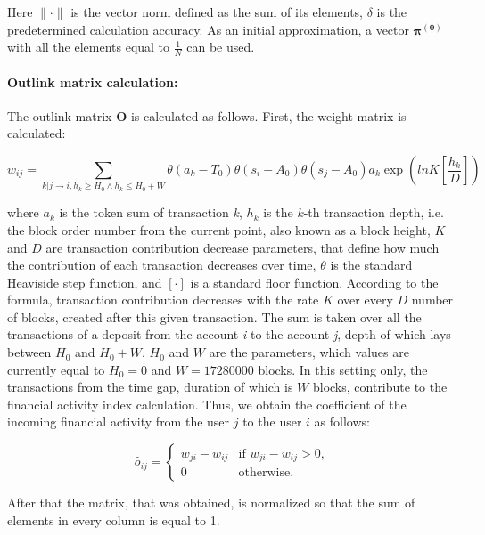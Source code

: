 \documentclass[a4paper,12pt]{article}
\begin{document}
Here $\lVert \cdot \rVert$ is the vector norm defined as the sum of its elements, $\delta$ is the predetermined calculation accuracy. As an initial approximation, a vector $\boldsymbol{\pi^{(0)}}$ with all the elements equal to $\frac{1}{N}$ can be used.



\paragraph{Outlink matrix calculation:}
The outlink matrix $\boldsymbol{O}$ is calculated as follows. First, the weight matrix is calculated:



$$
w_{ij}=\sum_{k|j \to i, {h_k \ge H_0} \land {h_k \le H_0+W}} \theta ( a_k - T_0 ) \theta ( s_i - A_0 ) \theta ( s_j - A_0 ) a_k \exp{(lnK [\frac{h_k}{D}])}
$$

where $a_k$ is the token sum of transaction \textit{k}, $h_k$ is the $k$-th transaction depth, i.e. the block order number from the current point, also known as a block height,  $K$ and $D$ are transaction contribution decrease parameters, that define how much the contribution of each transaction decreases over time, $\theta$ is the standard Heaviside step function, and $[ \cdot ]$ is a standard floor function. According to the formula, transaction contribution decreases with the rate $K$ over every $D$ number of blocks, created after this given transaction. The sum is taken over all the transactions of a deposit from the account \textit{i} to the account \textit{j}, depth of which lays between $H_0$ and $H_0+W$. $H_0$ and $W$ are the parameters, which values are currently equal to $H_0=0$ and $W=17280000$ blocks. In this setting only, the transactions from the time gap, duration of which is $W$ blocks, contribute to the financial activity index calculation. Thus, we obtain the coefficient of the incoming financial activity from the user $j$ to the user $i$ as follows:







$$
\hat{o}_{ij} = \begin{cases}
 w_{ji}-w_{ij}
 & \text{if $w_{ji}-w_{ij} > 0$,}\\
 0 & \text{otherwise.}
\end{cases}
$$

After that the matrix, that was obtained,  is normalized so that the sum of elements in every column is equal to 1.
\end{document}
